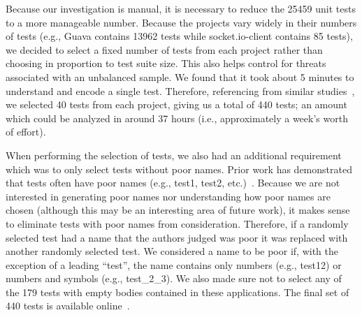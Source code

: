 Because our investigation is manual, it is necessary to reduce the \num{25459} unit tests to a more manageable number.
%
Because the projects vary widely in their numbers of tests (e.g., Guava contains \num{13962} tests while socket.io-client contains \num{85} tests), we decided to select a fixed number of tests from each project rather than choosing in proportion to test suite size.
%
This also helps control for threats associated with an unbalanced sample.
%
We found that it took about \num{5} minutes to understand and encode a single test.
%
Therefore, referencing from similar studies~\cite{wu2020pattern,zhang2016towards}, we selected \num{40} tests from each project, giving us a total of \num{440} tests; an amount which could be analyzed in around \num{37} hours (i.e., approximately a week’s worth of effort).


When performing the selection of tests, we also had an additional requirement which was to only select tests without poor names.
%
Prior work has demonstrated that tests often have poor names (e.g., test1, test2, etc.)~\cite{zhang2016towards}.
%
Because we are not interested in generating poor names nor understanding how poor names are chosen (although this may be an interesting area of future work), it makes sense to eliminate tests with poor names from consideration.
%
Therefore, if a randomly selected test had a name that the authors judged was poor it was replaced with another randomly selected test.
%
We considered a name to be poor if, with the exception of a leading \enquote{test}, the name contains only numbers (e.g., test12) or numbers and symbols (e.g., test\_2\_3).
%
We also made sure not to select any of the \num{179} tests with empty bodies contained in these applications.
The final set of \num{440} tests is available online~\cite{emp-data}.

